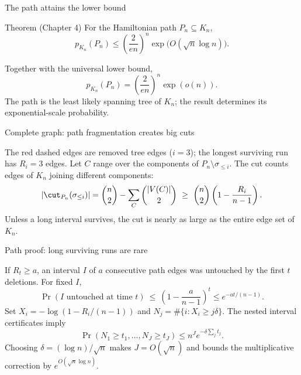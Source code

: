 \begin{frame}{The path attains the lower bound}
 \begin{block}{Theorem (Chapter 4)}
 For the Hamiltonian path \(P_n\subseteq K_n\),
 \[p_{K_n}(P_n)\le
 \left(\frac{2}{en}\right)^n
 \exp\bigl(O(\sqrt n\log n)\bigr).\]
 \end{block}
 Together with the universal lower bound,
 \[\boxed{p_{K_n}(P_n)=\left(\frac{2}{en}\right)^n\exp(o(n))}.\]
  The path is the least likely spanning tree of \(K_n\); the result determines its exponential-scale probability.
\end{frame}


\begin{frame}{Complete graph: path fragmentation creates big cuts}
 \centering\resizebox{.79\textwidth}{!}{\PathFragmentFig}\par
 \small The red dashed edges are removed tree edges ($i=3$); the longest surviving run has $R_i=3$ edges.
 \vspace{.15cm}
 Let $C$ range over the components of $P_n\setminus\sigma_{\le i}$. The cut counts edges of $K_n$ joining different components:
 \[|\cut_{P_n}(\sigma_{\le i})|=\binom n2-\sum_C\binom{|V(C)|}{2}
 \ \ge\ \binom n2\left(1-\frac{R_i}{n-1}\right).\]
 \vspace{.06cm}
  Unless a long interval survives, the cut is nearly as large as the entire edge set of $K_n$.
\end{frame}


\begin{frame}{Path proof: long surviving runs are rare}
 \centering\resizebox{.65\textwidth}{!}{\RareIntervalFig}\par
 \vspace{.08cm}
  If $R_t\ge a$, an interval $I$ of $a$ consecutive path edges was untouched by the first $t$ deletions. For fixed $I$,
 \[\Pr(I\text{ untouched at time }t)\ \le\ \left(1-\frac{a}{n-1}\right)^t\le e^{-at/(n-1)}.\]
  Set $X_i=-\log(1-R_i/(n-1))$ and $N_j=\#\{i:X_i\ge j\delta\}$.
 The nested interval certificates imply
 \[\Pr(N_1\ge t_1,\dots,N_J\ge t_J)\le n^J e^{-\delta\sum_jt_j}.\]
 \small Choosing $\delta=(\log n)/\sqrt n$ makes $J=O(\sqrt n)$ and bounds the multiplicative correction by $e^{O(\sqrt n\log n)}$.
\end{frame}


